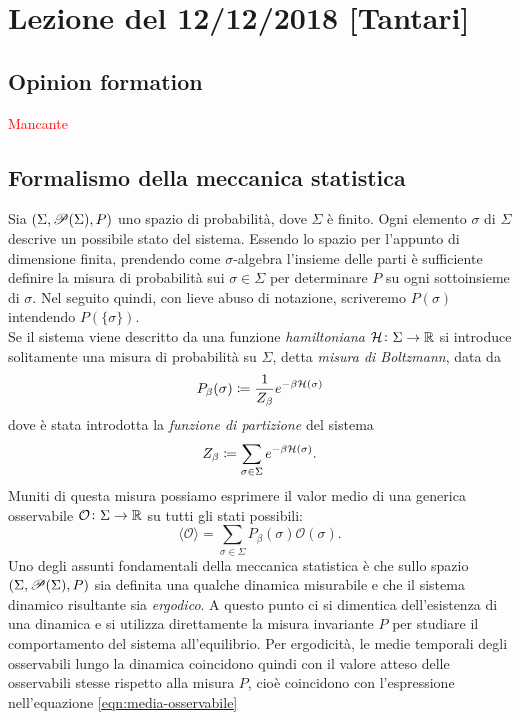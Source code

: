 \section{Lezione del 12/12/2018 [Tantari]}

\subsection{Opinion formation}
\textcolor{red}{Mancante}

\subsection{Formalismo della meccanica statistica}
Sia $ (\Sigma, \P(\Sigma), P) $ uno spazio di probabilità, dove $ \Sigma $ è finito. Ogni elemento $ \sigma $ di $ \Sigma $ descrive un possibile stato del sistema.
Essendo lo spazio per l'appunto di dimensione finita, prendendo come $ \sigma $-algebra l'insieme delle parti è sufficiente definire la misura di probabilità sui $ \sigma \in \Sigma $ per determinare $ P $ su ogni sottoinsieme di $ \sigma $.  Nel seguito quindi, con lieve abuso di notazione, scriveremo $ P(\sigma) $ intendendo $ P(\{\sigma\}) $. \\
Se il sistema viene descritto da una funzione \emph{hamiltoniana} $ \ham \colon \Sigma\to\R $ si introduce solitamente una misura di probabilità su $ \Sigma $, detta \emph{misura di Boltzmann}, data da
\begin{equation}
    P_\beta(\sigma) \coloneqq \frac{1}{Z_\beta} e^{-\beta\ham(\sigma)}
\end{equation}
dove è stata introdotta la \emph{funzione di partizione} del sistema
\begin{equation}
    Z_\beta \coloneqq \sum_{\sigma\in\Sigma} e^{-\beta \ham(\sigma)}.
\end{equation}
Muniti di questa misura possiamo esprimere il valor medio di una generica osservabile $ \mathcal{O}\colon \Sigma\to\R $ su tutti gli stati possibili:
\begin{equation} \label{eqn:media-osservabile}
    \langle\mathcal{O}\rangle = \sum_{\sigma\in\Sigma} P_\beta(\sigma)\mathcal{O}(\sigma).
\end{equation}
Uno degli assunti fondamentali della meccanica statistica è che sullo spazio $ (\Sigma, \P(\Sigma), P) $ sia definita una qualche dinamica misurabile e che il sistema dinamico risultante sia \emph{ergodico}. A questo punto ci si dimentica dell'esistenza di una dinamica e si utilizza direttamente la misura invariante $ P $ per studiare il comportamento del sistema all'equilibrio. Per ergodicità, le medie temporali degli osservabili lungo la dinamica coincidono quindi con il valore atteso delle osservabili stesse rispetto alla misura $ P $, cioè coincidono con l'espressione nell'equazione \eqref{eqn:media-osservabile} \\


